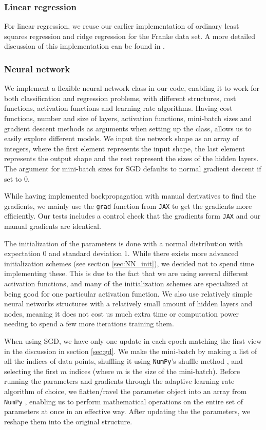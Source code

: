 \subsubsection{Linear regression}

For linear regression, we reuse our earlier implementation of ordinary least squares regression and ridge regression for the Franke data set. A more detailed discussion of this implementation can be found in \textcite{project1}.

\subsubsection{Neural network}\label{sec:nn_imp}

We implement a flexible neural network class in our code, enabling it to work for both classification and regression problems, with different structures, cost functions, activation functions and learning rate algorithms.
Having cost functions, number and size of layers, activation functions, mini-batch sizes and gradient descent methods as arguments when setting up the class, allows us to easily explore different models.
We input the network shape as an array of integers, where the first element represents the input shape, the last element represents the output shape and the rest represent the sizes of the hidden layers.
The argument for mini-batch sizes for SGD defaults to normal gradient descent if set to 0.

While having implemented backpropagation with manual derivatives to find the gradients, we mainly use the \texttt{grad} function from \texttt{JAX} \cite{jax2018github} to get the gradients more efficiently.
Our tests includes a control check that the gradients form \texttt{JAX} and our manual gradients are identical.

The initialization of the parameters is done with a normal distribution with expectation 0 and standard deviation 1.
While there exists more advanced initialization schemes (see section \ref{sec:NN_init}), we decided not to spend time implementing these.
This is due to the fact that we are using several different activation functions, and many of the initialization schemes are specialized at being good for one particular activation function.
We also use relatively simple neural networks structures with a relatively small amount of hidden layers and nodes, meaning it does not cost us much extra time or computation power needing to spend a few more iterations training them.

When using SGD, we have only one update in each epoch matching the first view in the discussion in section \ref{sec:gd}.
We make the mini-batch by making a list of all the indices of data points, shuffling it using \texttt{NumPy}'s shuffle method \cite{NumPy-Array}, and selecting the first $m$ indices (where $m$ is the size of the mini-batch).
Before running the parameters and gradients through the adaptive learning rate algorithm of choice, we flatten/ravel the parameter object into an array from \texttt{NumPy} \cite{NumPy-Array}, enabling us to perform mathematical operations on the entire set of parameters at once in an effective way.
After updating the the parameters, we reshape them into the original structure.


